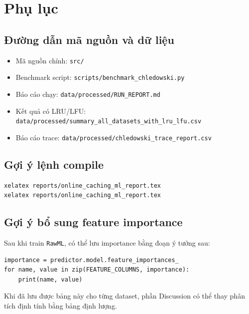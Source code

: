 \documentclass[11pt,a4paper]{article}
\newcommand{\code}[1]{\texttt{#1}}
\newcommand{\rawml}{\code{RawML}}
\begin{document}
\appendix
\section{Phụ lục}

\subsection{Đường dẫn mã nguồn và dữ liệu}

\begin{itemize}[leftmargin=1.4em]
    \item Mã nguồn chính: \code{src/}
    \item Benchmark script: \code{scripts/benchmark\_chledowski.py}
    \item Báo cáo chạy: \code{data/processed/RUN\_REPORT.md}
    \item Kết quả có LRU/LFU: \code{data/processed/summary\_all\_datasets\_with\_lru\_lfu.csv}
    \item Báo cáo trace: \code{data/processed/chledowski\_trace\_report.csv}
\end{itemize}

\subsection{Gợi ý lệnh compile}

\begin{verbatim}
xelatex reports/online_caching_ml_report.tex
xelatex reports/online_caching_ml_report.tex
\end{verbatim}

\subsection{Gợi ý bổ sung feature importance}

Sau khi train \rawml{}, có thể lưu importance bằng đoạn ý tưởng sau:

\begin{verbatim}
importance = predictor.model.feature_importances_
for name, value in zip(FEATURE_COLUMNS, importance):
    print(name, value)
\end{verbatim}

Khi đã lưu được bảng này cho từng dataset, phần Discussion có thể thay phân tích định tính bằng bảng định lượng.
\end{document}

